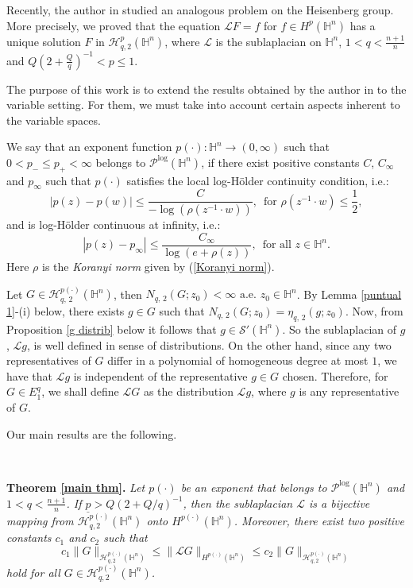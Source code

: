 \documentclass[oneside,10pt]{article}
\begin{document}
Recently, the author in \cite{rocha5} studied an analogous problem on the Heisenberg group. More precisely, we proved that the equation
$\mathcal{L} F = f$ for $f \in H^p(\mathbb{H}^n)$ has a unique solution $F$ in $\mathcal{H}^{p}_{q, 2}(\mathbb{H}^{n})$, where 
$\mathcal{L}$ is the sublaplacian on $\mathbb{H}^{n}$, $1 < q < \frac{n+1}{n}$ and $Q (2 + \frac{Q}{q})^{-1} < p \leq 1$.

The purpose of this work is to extend the results obtained by the author in \cite{rocha5} to the variable setting. For them, we must take into account certain aspects inherent to the variable spaces.

We say that an exponent function $p(\cdot) : \mathbb{H}^{n} \to (0, \infty)$ such that $0 < p_{-} \leq p_{+} < \infty$ belongs 
to $\mathcal{P}^{\log}(\mathbb{H}^{n})$, if there exist positive constants $C$, $C_{\infty}$ and $p_{\infty}$ such that $p(\cdot)$ satisfies the local log-H\"older continuity condition, i.e.:
\[
|p(z) - p(w)| \leq \frac{C}{-\log(\rho(z^{-1} \cdot w))}, \,\,\, \text{for} \,\, \rho(z^{-1} \cdot w) \leq \frac{1}{2},
\]
and is log-H\"older continuous at infinity, i.e.:
\[
|p(z) - p_{\infty}| \leq \frac{C_{\infty}}{\log(e+\rho(z))}, \,\,\, \text{for all} \,\, z \in \mathbb{H}^{n}.
\]
Here $\rho$ is the {\it Koranyi norm} given by (\ref{Koranyi norm}).

Let $G \in \mathcal{H}^{p(\cdot)}_{q, \, 2}(\mathbb{H}^{n})$, then $N_{q, \, 2}(G; z_0) < \infty$ $\text{a.e.} \,\, z_0 \in \mathbb{H}^{n}$. 
By Lemma \ref{puntual 1}-(i) below, there exists $g \in G$ such that $N_{q, \, 2}(G; z_0) = \eta_{q, \, 2}(g; z_0)$. Now, from 
Proposition \ref{g distrib} below it follows that $g  \in \mathcal{S}'(\mathbb{H}^{n})$. So the sublaplacian of $g$, $\mathcal{L}g$, is well defined in sense of distributions. On the other hand, since any two representatives of $G$ differ in a polynomial of homogeneous degree at most $1$, we have that $\mathcal{L}g$ is independent of the representative $g \in G$ chosen. Therefore, for $G \in E^{q}_{1}$, we shall define 
$\mathcal{L}G$ as the distribution $\mathcal{L}g$, where $g$ is any representative of $G$.

Our main results are the following.

\

{\bf Theorem \ref{main thm}.} \textit{Let $p(\cdot)$ be an exponent that belongs to $\mathcal{P}^{\log}(\mathbb{H}^{n})$ and 
$1 < q < \frac{n+1}{n}$. If $\underline{p} > Q (2 + Q/q)^{-1}$, then the sublaplacian $\mathcal{L}$ is a bijective mapping from 
$\mathcal{H}^{p(\cdot)}_{q, 2}(\mathbb{H}^{n})$ onto $H^{p(\cdot)}(\mathbb{H}^{n})$. Moreover, there exist two positive constants 
$c_1$ and $c_2$ such that
\[
c_1 \|G \|_{\mathcal{H}^{p(\cdot)}_{q, 2}(\mathbb{H}^{n})} \leq \| \mathcal{L}G \|_{H^{p(\cdot)}(\mathbb{H}^{n})} \leq 
c_2 \|G \|_{\mathcal{H}^{p(\cdot)}_{q, 2}(\mathbb{H}^{n})}
\]
hold for all $G \in \mathcal{H}^{p(\cdot)}_{q, 2}(\mathbb{H}^{n})$.}
\end{document}
